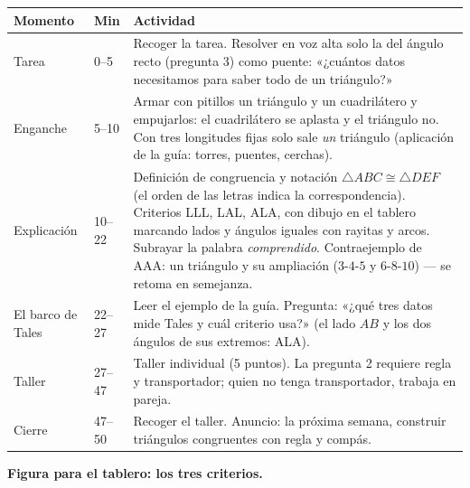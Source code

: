 \documentclass[11pt]{article}
\begin{document}
\begin{center}
{\renewcommand{\arraystretch}{1.3}
\begin{tabularx}{\linewidth}{@{}l l X@{}}
  \toprule
  \textbf{Momento} & \textbf{Min} & \textbf{Actividad}\\
  \midrule
  Tarea & 0--5 & Recoger la tarea. Resolver en voz alta solo la del ángulo recto (pregunta
    3) como puente: «¿cuántos datos necesitamos para saber todo de un triángulo?»\\
  Enganche & 5--10 & Armar con pitillos un triángulo y un cuadrilátero y empujarlos: el
    cuadrilátero se aplasta y el triángulo no. Con tres longitudes fijas solo sale
    \emph{un} triángulo (aplicación de la guía: torres, puentes, cerchas).\\
  Explicación & 10--22 & Definición de congruencia y notación $\triangle ABC \cong
    \triangle DEF$ (el orden de las letras indica la correspondencia). Criterios LLL, LAL,
    ALA, con dibujo en el tablero marcando lados y ángulos iguales con rayitas y arcos.
    Subrayar la palabra \emph{comprendido}. Contraejemplo de AAA: un triángulo y su
    ampliación ($3$-$4$-$5$ y $6$-$8$-$10$) — se retoma en semejanza.\\
  El barco de Tales & 22--27 & Leer el ejemplo de la guía. Pregunta: «¿qué tres datos mide
    Tales y cuál criterio usa?» (el lado $AB$ y los dos ángulos de sus extremos: ALA).\\
  Taller & 27--47 & Taller individual (5 puntos). La pregunta 2 requiere regla y
    transportador; quien no tenga transportador, trabaja en pareja.\\
  Cierre & 47--50 & Recoger el taller. Anuncio: la próxima semana, construir triángulos
    congruentes con regla y compás.\\
  \bottomrule
\end{tabularx}}
\end{center}

\textbf{Figura para el tablero: los tres criterios.}
\end{document}
